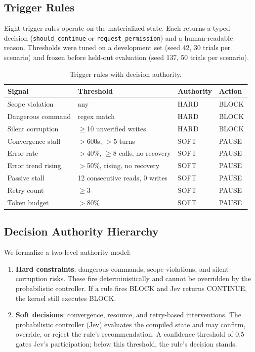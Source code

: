\documentclass[11pt,a4paper]{article}
\begin{document}
\subsection{Trigger Rules}

Eight trigger rules operate on the materialized state. Each returns a typed decision (\texttt{should\_continue} or \texttt{request\_permission}) and a human-readable reason. Thresholds were tuned on a development set (seed 42, 30 trials per scenario) and frozen before held-out evaluation (seed 137, 50 trials per scenario).

\begin{table}[H]
\centering
\small
\begin{tabular}{llll}
\toprule
\textbf{Signal} & \textbf{Threshold} & \textbf{Authority} & \textbf{Action} \\
\midrule
Scope violation & any & HARD & BLOCK \\
Dangerous command & regex match & HARD & BLOCK \\
Silent corruption & $\geq$10 unverified writes & HARD & BLOCK \\
Convergence stall & $>$600s, $>$5 turns & SOFT & PAUSE \\
Error rate & $>$40\%, $\geq$8 calls, no recovery & SOFT & PAUSE \\
Error trend rising & $>$50\%, rising, no recovery & SOFT & PAUSE \\
Passive stall & 12 consecutive reads, 0 writes & SOFT & PAUSE \\
Retry count & $\geq$3 & SOFT & PAUSE \\
Token budget & $>$80\% & SOFT & PAUSE \\
\bottomrule
\end{tabular}
\caption{Trigger rules with decision authority.}
\end{table}

\subsection{Decision Authority Hierarchy}

We formalize a two-level authority model:

\begin{enumerate}
\item \textbf{Hard constraints}: dangerous commands, scope violations, and silent-corruption risks. These fire deterministically and cannot be overridden by the probabilistic controller. If a rule fires BLOCK and Jev returns CONTINUE, the kernel still executes BLOCK.
\item \textbf{Soft decisions}: convergence, resource, and retry-based interventions. The probabilistic controller (Jev) evaluates the compiled state and may confirm, override, or reject the rule's recommendation. A confidence threshold of 0.5 gates Jev's participation; below this threshold, the rule's decision stands.
\end{enumerate}
\end{document}
